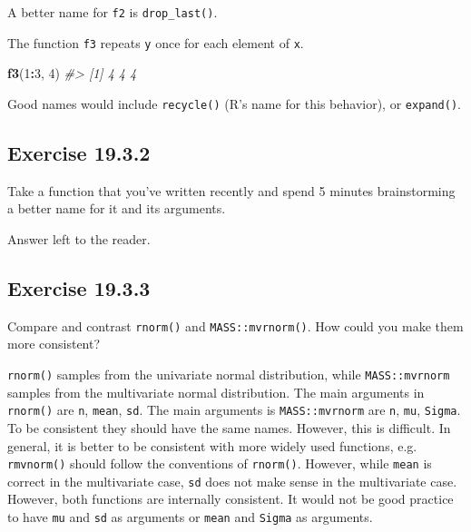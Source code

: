 \documentclass[]{book}
\newenvironment{Shaded}{\begin{snugshade}}{\end{snugshade}}
\newcommand{\CommentTok}[1]{\textcolor[rgb]{0.56,0.35,0.01}{\textit{#1}}}
\newcommand{\DecValTok}[1]{\textcolor[rgb]{0.00,0.00,0.81}{#1}}
\newcommand{\KeywordTok}[1]{\textcolor[rgb]{0.13,0.29,0.53}{\textbf{#1}}}
\newcommand{\NormalTok}[1]{#1}
\newcommand{\OperatorTok}[1]{\textcolor[rgb]{0.81,0.36,0.00}{\textbf{#1}}}
\theoremstyle{plain}
\theoremstyle{remark}
\begin{document}
A better name for \texttt{f2} is \texttt{drop\_last()}.

The function \texttt{f3} repeats \texttt{y} once for each element of
\texttt{x}.

\begin{Shaded}
\begin{Highlighting}[]
\KeywordTok{f3}\NormalTok{(}\DecValTok{1}\OperatorTok{:}\DecValTok{3}\NormalTok{, }\DecValTok{4}\NormalTok{)}
\CommentTok{#> [1] 4 4 4}
\end{Highlighting}
\end{Shaded}

Good names would include \texttt{recycle()} (R's name for this
behavior), or \texttt{expand()}.

\hypertarget{exercise-19.3.2}{%
\subsection*{\texorpdfstring{Exercise
{19.3.2}}{Exercise 19.3.2}}\label{exercise-19.3.2}}

Take a function that you've written recently and spend 5 minutes
brainstorming a better name for it and its arguments.

Answer left to the reader.

\hypertarget{exercise-19.3.3}{%
\subsection*{\texorpdfstring{Exercise
{19.3.3}}{Exercise 19.3.3}}\label{exercise-19.3.3}}

Compare and contrast \texttt{rnorm()} and \texttt{MASS::mvrnorm()}. How
could you make them more consistent?

\texttt{rnorm()} samples from the univariate normal distribution, while
\texttt{MASS::mvrnorm} samples from the multivariate normal
distribution. The main arguments in \texttt{rnorm()} are \texttt{n},
\texttt{mean}, \texttt{sd}. The main arguments is \texttt{MASS::mvrnorm}
are \texttt{n}, \texttt{mu}, \texttt{Sigma}. To be consistent they
should have the same names. However, this is difficult. In general, it
is better to be consistent with more widely used functions, e.g.
\texttt{rmvnorm()} should follow the conventions of \texttt{rnorm()}.
However, while \texttt{mean} is correct in the multivariate case,
\texttt{sd} does not make sense in the multivariate case. However, both
functions are internally consistent. It would not be good practice to
have \texttt{mu} and \texttt{sd} as arguments or \texttt{mean} and
\texttt{Sigma} as arguments.
\end{document}
